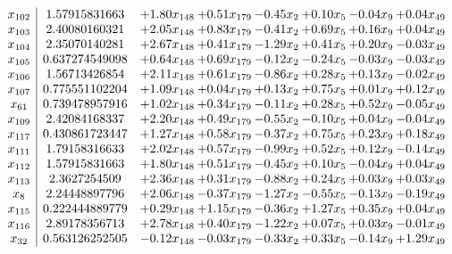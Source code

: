 \documentclass[8pt]{article}
\begin{document}
\[\begin{array}{c| c c@{\hskip 2pt} c@{\hskip 2pt} c@{\hskip 2pt} c@{\hskip 2pt} c@{\hskip 2pt} c@{\hskip 2pt} }
 x_{102}   &  1.57915831663 & +  1.80 x_{148} & +  0.51 x_{179} & -0.45 x_{2} & +  0.10 x_{5} & -0.04 x_{9} & +  0.04 x_{49}\\
 x_{103}   &  2.40080160321 & +  2.05 x_{148} & +  0.83 x_{179} & -0.41 x_{2} & +  0.69 x_{5} & +  0.16 x_{9} & +  0.04 x_{49}\\
 x_{104}   &  2.35070140281 & +  2.67 x_{148} & +  0.41 x_{179} & -1.29 x_{2} & +  0.41 x_{5} & +  0.20 x_{9} & -0.03 x_{49}\\
 x_{105}   &  0.637274549098 & +  0.64 x_{148} & +  0.69 x_{179} & -0.12 x_{2} & -0.24 x_{5} & -0.03 x_{9} & -0.03 x_{49}\\
 x_{106}   &  1.56713426854 & +  2.11 x_{148} & +  0.61 x_{179} & -0.86 x_{2} & +  0.28 x_{5} & +  0.13 x_{9} & -0.02 x_{49}\\
 x_{107}   &  0.775551102204 & +  1.09 x_{148} & +  0.04 x_{179} & +  0.13 x_{2} & +  0.75 x_{5} & +  0.01 x_{9} & +  0.12 x_{49}\\
 x_{61}   &  0.739478957916 & +  1.02 x_{148} & +  0.34 x_{179} & -0.11 x_{2} & +  0.28 x_{5} & +  0.52 x_{9} & -0.05 x_{49}\\
 x_{109}   &  2.42084168337 & +  2.20 x_{148} & +  0.49 x_{179} & -0.55 x_{2} & -0.10 x_{5} & +  0.04 x_{9} & -0.04 x_{49}\\
 x_{117}   &  0.430861723447 & +  1.27 x_{148} & +  0.58 x_{179} & -0.37 x_{2} & +  0.75 x_{5} & +  0.23 x_{9} & +  0.18 x_{49}\\
 x_{111}   &  1.79158316633 & +  2.02 x_{148} & +  0.57 x_{179} & -0.99 x_{2} & +  0.52 x_{5} & +  0.12 x_{9} & -0.14 x_{49}\\
 x_{112}   &  1.57915831663 & +  1.80 x_{148} & +  0.51 x_{179} & -0.45 x_{2} & +  0.10 x_{5} & -0.04 x_{9} & +  0.04 x_{49}\\
 x_{113}   &  2.3627254509 & +  2.36 x_{148} & +  0.31 x_{179} & -0.88 x_{2} & +  0.24 x_{5} & +  0.03 x_{9} & +  0.03 x_{49}\\
 x_{8}   &  2.24448897796 & +  2.06 x_{148} & -0.37 x_{179} & -1.27 x_{2} & -0.55 x_{5} & -0.13 x_{9} & -0.19 x_{49}\\
 x_{115}   &  0.222444889779 & +  0.29 x_{148} & +  1.15 x_{179} & -0.36 x_{2} & +  1.27 x_{5} & +  0.35 x_{9} & +  0.04 x_{49}\\
 x_{116}   &  2.89178356713 & +  2.78 x_{148} & +  0.40 x_{179} & -1.22 x_{2} & +  0.07 x_{5} & +  0.03 x_{9} & -0.01 x_{49}\\
 x_{32}   &  0.563126252505 & -0.12 x_{148} & -0.03 x_{179} & -0.33 x_{2} & +  0.33 x_{5} & -0.14 x_{9} & +  1.29 x_{49}\\

\end{array}\]
\end{document}
